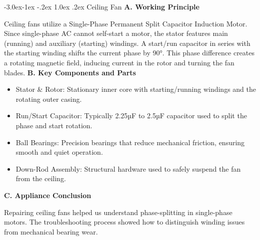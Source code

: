 \documentclass[11pt,a4paper]{report}
\makeatletter
\renewcommand{\subsection}{\@startsection{subsection}{2}{\z@}%
  {-3.0ex\@plus -1ex \@minus -.2ex}%
  {1.0ex \@plus .2ex}%
  {\normalfont\large\bfseries\color{secondaryColor}}}
\makeatother
\begin{document}
\subsection{Ceiling Fan}
\noindent\textbf{A. Working Principle}\par\medskip
Ceiling fans utilize a Single-Phase Permanent Split Capacitor Induction Motor. Since single-phase AC cannot self-start a motor, the stator features main (running) and auxiliary (starting) windings. A start/run capacitor in series with the starting winding shifts the current phase by 90°. This phase difference creates a rotating magnetic field, inducing current in the rotor and turning the fan blades.
\noindent\textbf{B. Key Components and Parts}\par\medskip
\begin{itemize}
  \item Stator \& Rotor: Stationary inner core with starting/running windings and the rotating outer casing.
  \item Run/Start Capacitor: Typically 2.25µF to 2.5µF capacitor used to split the phase and start rotation.
  \item Ball Bearings: Precision bearings that reduce mechanical friction, ensuring smooth and quiet operation.
  \item Down-Rod Assembly: Structural hardware used to safely suspend the fan from the ceiling.
\end{itemize}
\noindent\textbf{C. Appliance Conclusion}\par\medskip
Repairing ceiling fans helped us understand phase-splitting in single-phase motors. The troubleshooting process showed how to distinguish winding issues from mechanical bearing wear.
\end{document}

